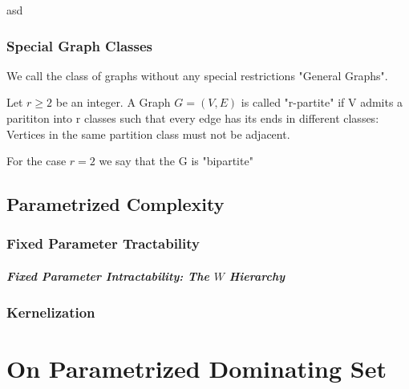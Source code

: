 \begin{definition}
    asd
\end{definition}

\subsection*{Special Graph Classes}
We call the class of graphs without any special restrictions "General Graphs".

\begin{definition}
    Let $r \geq 2$ be an integer. A Graph $G = (V,E)$ is called "r-partite" if V admits a parititon into r classes such that every edge has its ends in different classes: Vertices in the same partition class must not be adjacent. 
    
    For the case $r = 2$ we say that the G is "bipartite" 

\end{definition}

\begin{definition}
    
\end{definition}

\begin{definition}
    
\end{definition}


\section{Parametrized Complexity}

\subsection{Fixed Parameter Tractability}
\paragraph{Fixed Parameter Intractability: The \hmath $W$ Hierarchy}
\subsection{Kernelization}


\chapter{On Parametrized Dominating Set}
